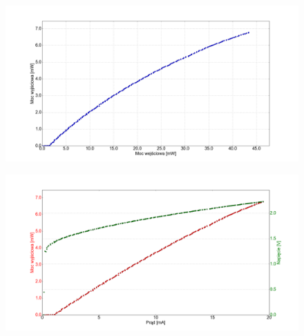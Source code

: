 \documentclass[xcolor={dvipsnames,table}]{beamer}
\begin{document}
\begin{frame}
\center
\begin{figure}
   \includegraphics[width=1.10\textwidth,natwidth=69,natheight=87]{temp_10_power.png}
\end{figure}

\end{frame}

\begin{frame}
\center
\begin{figure}
   \includegraphics[width=1.10\textwidth,natwidth=69,natheight=87]{temp_10_IVL.png}
\end{figure}

\end{frame}
\end{document}
